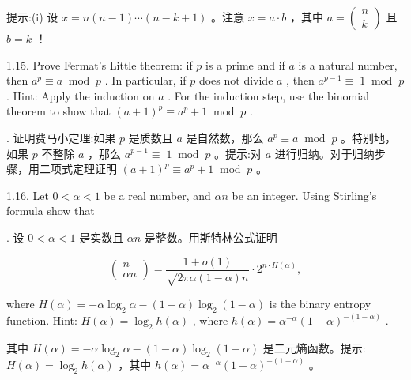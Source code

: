 \documentclass[10pt]{article}
\begin{document}
\begin{tcolorbox}\relax
提示:(i) 设 \(x = n\left( {n - 1}\right) \cdots \left( {n - k + 1}\right)\) 。注意 \(x = a \cdot  b\) ，其中 \(a = \left( \begin{array}{l} n \\  k \end{array}\right)\) 且 \(b = k\) ！
\end{tcolorbox}

1.15. Prove Fermat’s Little theorem: if \(p\) is a prime and if \(a\) is a natural number, then \({a}^{p} \equiv  a{\;\operatorname{mod}\;p}\) . In particular, if \(p\) does not divide \(a\) , then \({a}^{p - 1} \equiv \; 1{\;\operatorname{mod}\;p}\) . Hint: Apply the induction on \(a\) . For the induction step, use the binomial theorem to show that \({\left( a + 1\right) }^{p} \equiv  {a}^{p} + 1{\;\operatorname{mod}\;p}\) .

\begin{tcolorbox}. 证明费马小定理:如果 \(p\) 是质数且 \(a\) 是自然数，那么 \({a}^{p} \equiv  a{\;\operatorname{mod}\;p}\) 。特别地，如果 \(p\) 不整除 \(a\) ，那么 \({a}^{p - 1} \equiv \; 1{\;\operatorname{mod}\;p}\) 。提示:对 \(a\) 进行归纳。对于归纳步骤，用二项式定理证明 \({\left( a + 1\right) }^{p} \equiv  {a}^{p} + 1{\;\operatorname{mod}\;p}\) 。
\end{tcolorbox}

1.16. Let \(0 < \alpha  < 1\) be a real number, and \({\alpha n}\) be an integer. Using Stirling’s formula show that

\begin{tcolorbox}. 设 \(0 < \alpha  < 1\) 是实数且 \({\alpha n}\) 是整数。用斯特林公式证明
\end{tcolorbox}

\[
\left( \begin{matrix} n \\  {\alpha n} \end{matrix}\right)  = \frac{1 + o\left( 1\right) }{\sqrt{{2\pi \alpha }\left( {1 - \alpha }\right) n}} \cdot  {2}^{n \cdot  H\left( \alpha \right) },
\]

where \(H\left( \alpha \right)  =  - \alpha {\log }_{2}\alpha  - \left( {1 - \alpha }\right) {\log }_{2}\left( {1 - \alpha }\right)\) is the binary entropy function. Hint: \(H\left( \alpha \right)  = {\log }_{2}h\left( \alpha \right)\) , where \(h\left( \alpha \right)  = {\alpha }^{-\alpha }{\left( 1 - \alpha \right) }^{-\left( {1 - \alpha }\right) }\) .

\begin{tcolorbox}\relax
其中 \(H\left( \alpha \right)  =  - \alpha {\log }_{2}\alpha  - \left( {1 - \alpha }\right) {\log }_{2}\left( {1 - \alpha }\right)\) 是二元熵函数。提示: \(H\left( \alpha \right)  = {\log }_{2}h\left( \alpha \right)\) ，其中 \(h\left( \alpha \right)  = {\alpha }^{-\alpha }{\left( 1 - \alpha \right) }^{-\left( {1 - \alpha }\right) }\) 。
\end{tcolorbox}
\end{document}
